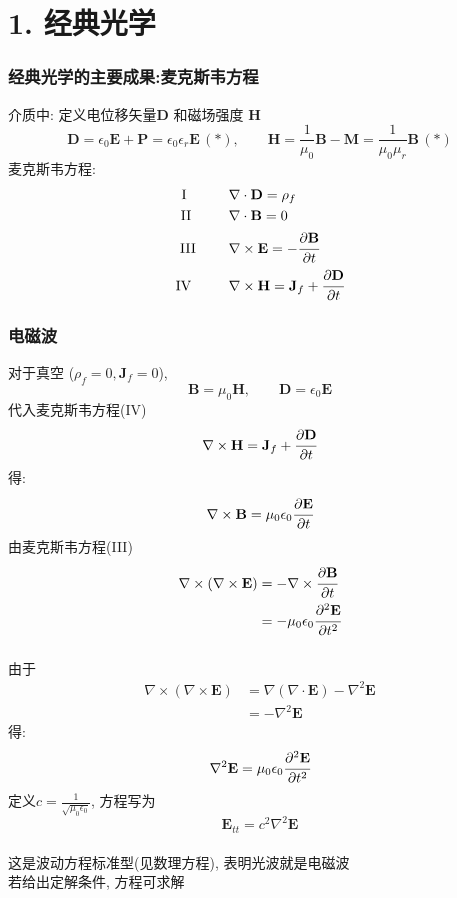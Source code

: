 \section{1. 经典光学}

\begin{frame}
      \frametitle{经典光学的主要成果:麦克斯韦方程}
    介质中: 定义电位移矢量$\mathbf{D}$ 和磁场强度 $\mathbf{H}$
\[ \mathbf{D}=\epsilon_0 \mathbf{E} + \mathbf{P} = \epsilon_0 \epsilon_r \mathbf{E} \, (*),  \qquad \mathbf{H}=\frac{1}{\mu_0} \mathbf{B} -\mathbf{M}= \frac{1}{\mu_0\mu_r}\mathbf{B} \, (*)\]
\pause
麦克斯韦方程:
\[ \begin{aligned}
        \text{I}~~~ \hspace*{2em}&\nabla \cdot \mathbf{D} =\rho _f  \\  
        \text{II}~~ \hspace*{2em}&\nabla \cdot \mathbf{B} = 0  \\  
        \text{III}~ \hspace*{2em}&\nabla \times  \mathbf{E} = -\cfrac{\partial \mathbf{B}}{\partial t }  \\  
        \text{IV~}~ \hspace*{2em}&\nabla \times  \mathbf{H} = \mathbf{J}_f +  \cfrac{\partial \mathbf{D}}{\partial t } 
    \end{aligned} \]
\end{frame}

\begin{frame}
      \frametitle{电磁波}
    对于真空 ($\rho _f =0, \mathbf{J}_f =0 $),  \[ \mathbf{B} = \mu_0 \mathbf{H}, \qquad  \mathbf{D} = \epsilon_0 \mathbf{E} \]
    \pause
代入麦克斯韦方程(IV)
 \[ \nabla \times  \mathbf{H} = \mathbf{J}_f +  \cfrac{\partial \mathbf{D}}{\partial t } \]
得: \[ \nabla \times \mathbf{B} = \mu_0\epsilon_0 \cfrac{\partial \mathbf{E}} {\partial t } \]
\pause
由麦克斯韦方程(III)
\[    
\begin{aligned}
  \nabla \times (\nabla \times  \mathbf{E}) &= - \nabla \times \cfrac{\partial \mathbf{B}}{\partial t } \\
  &= - \mu_0\epsilon_0  \cfrac{\partial ^2 \mathbf{E}} {\partial t^2 }
\end{aligned} \]  
\end{frame}

\begin{frame}
      \frametitle{}
    由于
  \[
  \begin{aligned}
      \nabla \times (\nabla \times  \mathbf{E}) &=  \nabla (\nabla \cdot  \mathbf{E})- \nabla^2 \mathbf{E} \\
      &= - \nabla^2 \mathbf{E} 
  \end{aligned} \]
  得:
  \[
  \nabla^2 \mathbf{E}= \mu_0\epsilon_0 \cfrac{\partial ^2 \mathbf{E}} {\partial t^2 }\]
  \pause
  定义$ c= \frac{1}{\sqrt{\mu_0\epsilon_0}} $, 方程写为
  \[\boxed{\mathbf{E}_{tt} =c^2\nabla^2 \mathbf{E}}\]
  ~~\\
  \pause
  这是波动方程标准型(见数理方程), 表明光波就是电磁波 \\ 若给出定解条件, 方程可求解 \\  
\end{frame}

